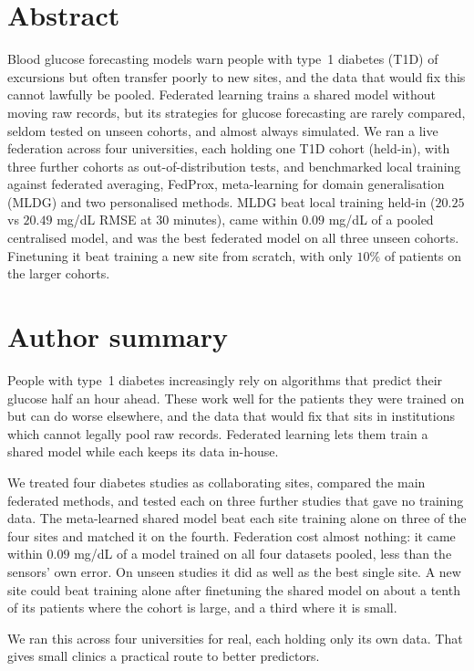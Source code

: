 \documentclass[10pt,letterpaper]{article}
\begin{document}
\section*{Abstract}
Blood glucose forecasting models warn people with type~1 diabetes (T1D) of
excursions but often transfer poorly to new sites, and the data that would fix
this cannot lawfully be pooled. Federated learning trains a shared model
without moving raw records, but its strategies for glucose forecasting are
rarely compared, seldom tested on unseen cohorts, and almost always simulated.
We ran a live federation across four universities, each holding one T1D cohort
(held-in), with three further cohorts as out-of-distribution tests, and
benchmarked local training against federated averaging, FedProx, meta-learning
for domain generalisation (MLDG) and two personalised methods. MLDG beat local
training held-in ($20.25$ vs $20.49$ mg/dL RMSE at 30 minutes), came within
$0.09$ mg/dL of a pooled centralised model, and was the best federated model
on all three unseen cohorts. Finetuning it beat training a new site from
scratch, with only $10\%$ of patients on the larger cohorts.

\section*{Author summary}
People with type~1 diabetes increasingly rely on algorithms that predict their
glucose half an hour ahead. These work well for the patients they were trained
on but can do worse elsewhere, and the data that would fix that sits in
institutions which cannot legally pool raw records. Federated learning lets
them train a shared model while each keeps its data in-house.

We treated four diabetes studies as collaborating sites, compared the main
federated methods, and tested each on three further studies that gave no
training data. The meta-learned shared model beat each site training alone
on three of the four sites and matched it on the fourth. Federation cost almost nothing: it came within $0.09$ mg/dL
of a model trained on all four datasets pooled, less than the sensors' own
error. On unseen studies it did as well as the best single site. A new site
could beat training alone after finetuning the shared model on about a tenth
of its patients where the cohort is large, and a third where it is small.

We ran this across four universities for real, each holding only its own data.
That gives small clinics a practical route to better predictors.
\end{document}
